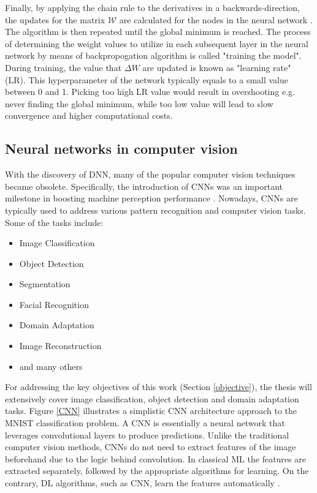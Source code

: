 Finally, by applying the chain rule to the derivatives in a backwards-direction, the updates for the matrix $\mathcal{W}$ are calculated for the nodes in the neural network \cite{Alber2018}. The algorithm is then repeated until the global minimum is reached. The process of determining the weight values to utilize in each subsequent layer in the neural network by means of backpropogation algorithm is called "training the model". During training, the value that $\Delta W$ are updated is known as "learning rate" (LR). This hyperparameter of the network typically equals to a small value between 0 and 1. Picking too high LR value would result in overshooting e.g. never finding the global minimum, while too low value will lead to slow convergence and higher computational costs. 

\FloatBarrier

\subsection{Neural networks in computer vision}
\label{neural_nets} 
With the discovery of DNN, many of the popular computer vision techniques became obsolete. Specifically, the introduction of CNNs was an important milestone in boosting machine perception performance \cite{Mahony2019}. Nowadays, CNNs are typically used to address various pattern recognition and computer vision tasks. Some of the tasks  include:

\begin{itemize}
	\item Image Classification
	\item Object Detection
	\item Segmentation
	\item Facial Recognition
	\item Domain Adaptation
	\item Image Reconstruction
	\item and many others \cite{paperswithcode:2022}
\end{itemize}

For addressing the key objectives of this work (Section \ref{objective}), the thesis will extensively cover image classification, object detection and domain adaptation tasks. Figure \ref{CNN} illustrates a simplistic CNN architecture approach to the MNIST  \cite{lecun-mnisthandwrittendigit-2010} classification problem. A CNN is essentially a neural network that leverages convolutional layers to produce predictions. Unlike the traditional computer vision methods, CNNs do not need to extract features of the image beforehand due to the logic behind convolution. In classical ML the features are extracted separately, followed by the appropriate algorithms for learning. On the contrary, DL algorithms, such as CNN, learn the features automatically \cite{alom01}.



